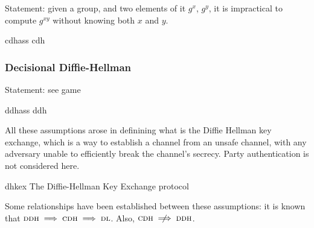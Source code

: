 Statement: given a group, and two elements of it $g^x$, $g^y$, it is impractical to compute $g^{xy}$ without knowing both $x$ and $y$.

\begin{cryptogame}
    {cdhass}
    {}
    {cdh}


    
\end{cryptogame}

\subsubsection{Decisional Diffie-Hellman}

Statement: see game

\begin{cryptogame}
    {ddhass}
    {}
    {ddh}

    \cseqdelay


    \cseqdelay

    
\end{cryptogame}

All these assumptions arose in definining what is the Diffie Hellman key exchange, which is a way to establish a \ske{} channel from an unsafe channel, with any adversary unable to efficiently break the channel's secrecy. Party authentication is not considered here.

\begin{cryptogame}
    {dhkex}
    {The Diffie-Hellman Key Exchange protocol}
    {}


    \cseqdelay

    
\end{cryptogame}

Some relationships have been established between these assumptions: it is known that $\textsc{ddh} \implies \textsc{cdh} \implies \textsc{dl}$. Also, $\cdh \notimplies \ddh$.
